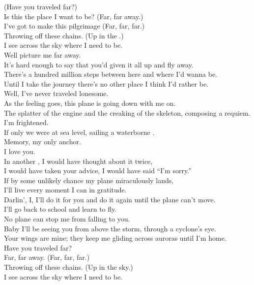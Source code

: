 (Have you traveled far?) \\
Is this the place I want to be? (Far, far away.) \\
I've got to make this pilgrimage (Far, far, far.) \\
Throwing off these chains. (Up in the .) \\
I see across the sky where I need to be. \\

Well picture me far away. \\
It's hard enough to say that you'd given it all up and fly away. \\
There's a hundred million steps between here and where I'd wanna be. \\
Until I take the journey there's no other place I think I'd rather be. \\

Well, I've never traveled lonesome. \\
As the feeling goes, this plane is going down with me on. \\

The splatter of the engine and the creaking of the skeleton, composing a requiem. \\
I'm frightened. \\
If only we were at sea level, sailing a waterborne . \\
Memory, my only anchor. \\
I love you. \\
In another , I would have thought about it twice, \\
I would have taken your advice, I would have said ``I'm sorry.'' \\
If by some unlikely chance my plane miraculously lands, \\
I'll live every moment I can in gratitude. \\

Darlin', I, I'll do it for you and do it again until the plane can't move. \\
I'll go back to school and learn to fly. \\
No plane can stop me from falling to you. \\
Baby I'll be seeing you from above the storm, through a cyclone's eye. \\
Your wings are mine; they keep me gliding across auroras until I'm home. \\

Have you traveled far? \\
Far, far away. (Far, far, far.) \\
Throwing off these chains. (Up in the sky.) \\
I see across the sky where I need to be. \\

